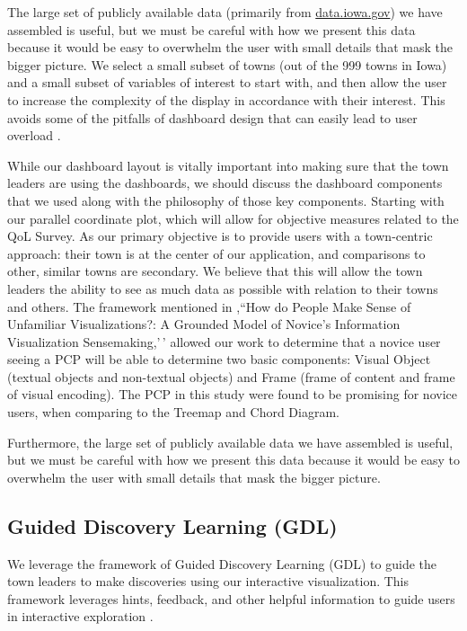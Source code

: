 \documentclass[letterpaper,inpress]{jdsart}
\begin{document}
The large set of publicly available data (primarily from \url{data.iowa.gov}) we have assembled is useful, but we must be careful with how we present this data because it would be easy to overwhelm the user with small details that mask the bigger picture. We select a small subset of towns (out of the 999 towns in Iowa) and a small subset of variables of interest to start with, and then allow the user to increase the complexity of the display in accordance with their interest. This avoids some of the pitfalls of dashboard design that can easily lead to user overload \citet{few}.

While our dashboard layout is vitally important into making sure that the town leaders are using the dashboards, we should discuss the dashboard components that we used along with the philosophy of those key components. Starting with our parallel coordinate plot, which will allow for objective measures related to the QoL Survey. As our primary objective is to provide users with a town-centric approach: their town is at the center of our application, and comparisons to other, similar towns are secondary. We believe that this will allow the town leaders the ability to see as much data as possible with relation to their towns and others. The framework mentioned in \citet{lee},``How do People Make Sense of Unfamiliar Visualizations?: A Grounded Model of Novice's Information Visualization Sensemaking,'\,' allowed our work to determine that a novice user seeing a PCP will be able to determine two basic components: Visual Object (textual objects and non-textual objects) and Frame (frame of content and frame of visual encoding). The PCP in this study were found to be promising for novice users, when comparing to the Treemap and Chord Diagram.

Furthermore, the large set of publicly available data we have assembled is useful, but we must be careful with how we present this data because it would be easy to overwhelm the user with small details that mask the bigger picture.

\subsection{Guided Discovery Learning (GDL)}

We leverage the framework of Guided Discovery Learning (GDL) to guide the town leaders to make discoveries using our interactive visualization. This framework leverages hints, feedback, and other helpful information to guide users in interactive exploration \citet{dedonno}.
\end{document}
